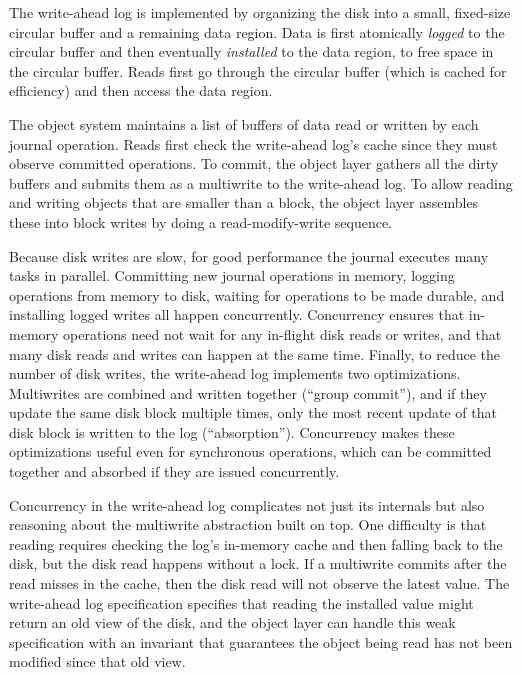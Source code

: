 The write-ahead log is implemented by organizing the disk into a small,
fixed-size circular buffer and a remaining data region. Data is first atomically
\emph{logged} to the circular buffer and then eventually \emph{installed}
to the data region, to free space in the circular buffer. Reads first go through
the circular buffer (which is cached for efficiency) and then access the data
region.

The object system maintains a list of buffers of data read or written by each journal operation.
Reads first check the write-ahead log's cache since
they must observe committed operations. To commit, the object
layer gathers all the dirty buffers and submits them as a multiwrite to the
write-ahead log. To allow reading and writing objects that are smaller than a
block, the object layer assembles these into block writes by doing a
read-modify-write sequence.

Because disk writes are slow, for good performance the journal executes many
tasks in parallel. Committing new journal operations in memory, logging operations
from memory to disk, waiting for operations to be made durable, and
installing logged writes all happen concurrently.  Concurrency ensures that
in-memory operations
need not wait for any in-flight disk reads or writes, and that many
disk reads and writes can happen at the same time.  Finally, to reduce the
number of disk writes, the write-ahead log implements two optimizations.
Multiwrites are combined and written
together (``group commit''), and if they update the same disk
block multiple times, only the most recent update of that disk block is
written to the log (``absorption''). Concurrency makes these optimizations
useful even for synchronous operations, which can be committed together and
absorbed if they are issued concurrently.

Concurrency in the write-ahead log complicates not just its internals but also
reasoning about the multiwrite abstraction built on top. One difficulty is that
reading requires checking the log's in-memory cache and then falling back to the disk,
but the disk read happens without a lock. If a multiwrite commits after the read
misses in the cache, then the disk read will not observe the latest value. The
write-ahead log specification specifies that reading the installed value might return an
old view of the disk, and the object layer can handle this weak specification with
an invariant that guarantees the object being read has not been modified since
that old view.

